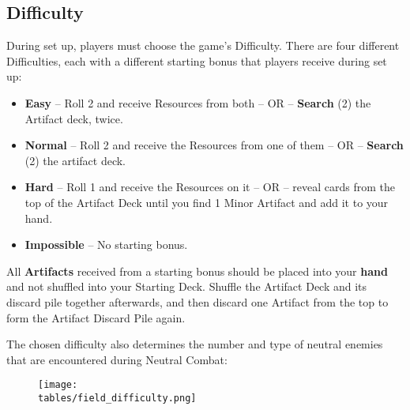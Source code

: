 \begin{multicols}{2}

\subsection*{\hypertarget{Difficulty}{Difficulty}}
During set up, players must choose the game's Difficulty.
There are four different Difficulties, each with a different starting bonus that players receive during set up:
\begin{itemize}
  \item \textbf{Easy} – Roll 2  and receive Resources from both – OR – \textbf{Search} (2) the Artifact deck, twice.
  \item \textbf{Normal} – Roll 2  and receive the Resources from one of them – OR – \textbf{Search} (2) the artifact deck.
  \item \textbf{Hard} – Roll 1  and receive the Resources on it – OR – reveal cards from the top of the Artifact Deck until you find 1 Minor Artifact and add it to your hand.
  \item \textbf{Impossible} – No starting bonus.
\end{itemize}
All \textbf{Artifacts} received from a starting bonus should be placed into your \textbf{hand} and not shuffled into your Starting Deck.
Shuffle the Artifact Deck and its discard pile together afterwards, and then discard one Artifact from the top to form the Artifact Discard Pile again.\par
The chosen difficulty also determines the number and type of neutral enemies that are encountered during Neutral Combat:

\end{multicols}

\vfill
\begin{figure*}[!hb]
  \centering
  \texttt{[image: \\tables/field\_difficulty.png]}
\end{figure*}
\vfill
